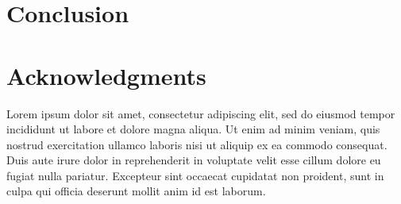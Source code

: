 \documentclass{sigchi}
\begin{document}
%
%
%
%
%

\section{Conclusion}


\section{Acknowledgments}
Lorem ipsum dolor sit amet, consectetur adipiscing elit, sed do eiusmod tempor incididunt ut labore et dolore magna aliqua. Ut enim ad minim veniam, quis nostrud exercitation ullamco laboris nisi ut aliquip ex ea commodo consequat. Duis aute irure dolor in reprehenderit in voluptate velit esse cillum dolore eu fugiat nulla pariatur. Excepteur sint occaecat cupidatat non proident, sunt in culpa qui officia deserunt mollit anim id est laborum.
\end{document}
